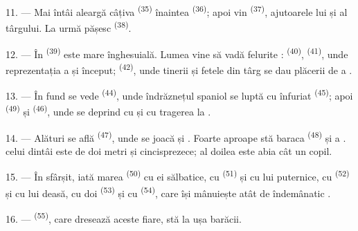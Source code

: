 11. --- Mai întâi aleargă câțiva  \textsuperscript{(35)}
înaintea  \textsuperscript{(36)}; apoi vin 
\textsuperscript{(37)}, ajutoarele lui și  al
târgului. La urmă pășesc  \textsuperscript{(38)}.

\VUsaut{5.0mm}
\VUsaut{3.6mm}

12. --- În  \textsuperscript{(39)} este mare înghesuială.
Lumea vine să vadă felurite : 
\textsuperscript{(40)},  \textsuperscript{(41)}, unde
reprezentația a și început;  \textsuperscript{(42)}, unde
tinerii și fetele din târg se dau plăcerii de a .

13. --- În fund se vede  \textsuperscript{(44)}, unde îndrăznețul
 spaniol se luptă cu  înfuriat
\textsuperscript{(45)}; apoi  \textsuperscript{(49)} și
 \textsuperscript{(46)}, unde se deprind cu 
și cu tragerea la .

14. --- Alături se află  \textsuperscript{(47)}, unde se
joacă  și . Foarte aproape stă baraca
 \textsuperscript{(48)} și a .
 celui dintâi este de doi metri și cincisprezece; al doilea este
abia cât un copil.

15. --- În sfârșit, iată marea  \textsuperscript{(50)} cu
 ei sălbatice, cu  \textsuperscript{(51)} și cu
 lui puternice, cu  \textsuperscript{(52)} și cu
 lui deasă, cu doi  \textsuperscript{(53)} și cu
 \textsuperscript{(54)}, care își mânuiește atât de îndemânatic
.

16. ---  \textsuperscript{(55)}, care dresează aceste fiare,
stă la ușa barăcii.
\VUsaut{6.0mm}
\VUfilet{22mm}
